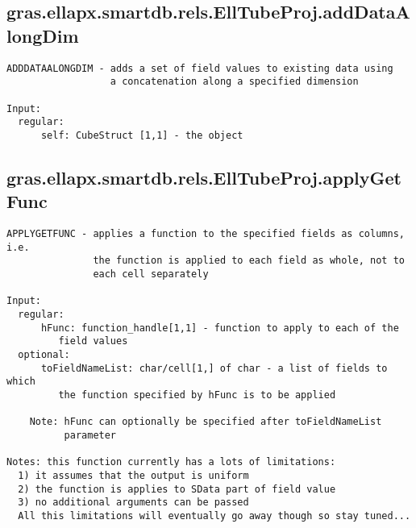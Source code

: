 \subsection{\texorpdfstring{gras.ellapx.smartdb.rels.EllTubeProj.addDataAlongDim}{addDataAlongDim}}\label{method:gras.ellapx.smartdb.rels.EllTubeProj.addDataAlongDim}
\begin{verbatim}
ADDDATAALONGDIM - adds a set of field values to existing data using
                  a concatenation along a specified dimension

Input:
  regular:
      self: CubeStruct [1,1] - the object
\end{verbatim}
\subsection{\texorpdfstring{gras.ellapx.smartdb.rels.EllTubeProj.applyGetFunc}{applyGetFunc}}\label{method:gras.ellapx.smartdb.rels.EllTubeProj.applyGetFunc}
\begin{verbatim}
APPLYGETFUNC - applies a function to the specified fields as columns, i.e.
               the function is applied to each field as whole, not to
               each cell separately

Input:
  regular:
      hFunc: function_handle[1,1] - function to apply to each of the
         field values
  optional:
      toFieldNameList: char/cell[1,] of char - a list of fields to which
         the function specified by hFunc is to be applied

    Note: hFunc can optionally be specified after toFieldNameList
          parameter

Notes: this function currently has a lots of limitations:
  1) it assumes that the output is uniform
  2) the function is applies to SData part of field value
  3) no additional arguments can be passed
  All this limitations will eventually go away though so stay tuned...
\end{verbatim}
